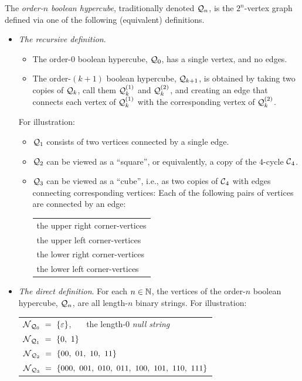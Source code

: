 The {\it order-$n$ boolean hypercube}, traditionally denoted $\mbox{$\cal Q$}_n$, is the $2^n$-vertex graph defined via one of the following (equivalent) definitions.
\begin{itemize}
\item
{\it The recursive definition}. 
  \begin{itemize}
  \item
The order-$0$ boolean hypercube, $\mbox{$\cal Q$}_0$, has a single vertex, and no edges.
  \medskip\item
The order-$(k+1)$ boolean hypercube, $\mbox{$\cal Q$}_{k+1}$, is obtained by taking two copies of $\mbox{$\cal Q$}_k$, call them $\mbox{$\cal Q$}_k^{(1)}$ and $\mbox{$\cal Q$}_k^{(2)}$, and creating an edge that connects each vertex of $\mbox{$\cal Q$}_k^{(1)}$ with the corresponding vertex of $\mbox{$\cal Q$}_k^{(2)}$.
  \end{itemize}
For illustration:
  \begin{itemize}
  \item
$\mbox{$\cal Q$}_1$ consists of two vertices connected by a single edge.
  \medskip\item
$\mbox{$\cal Q$}_2$ can be viewed as a ``square'', or equivalently, a copy of the $4$-cycle $\mbox{$\cal C$}_4$.
  \medskip\item
$\mbox{$\cal Q$}_3$ can be viewed as a ``cube'', i.e., as two copies of $\mbox{$\cal C$}_4$ with edges connecting corresponding vertices: Each of the following pairs of vertices are connected by an edge:

\smallskip

\hspace*{.25in}\begin{tabular}{l}
the upper right corner-vertices \\
the upper left corner-vertices \\
the lower right corner-vertices \\
the lower left corner-vertices
\end{tabular}
  \end{itemize}

\medskip\item
{\it The direct definition}.
For each $n \in \mathbb{N}$, the vertices of the order-$n$ boolean hypercube,
$\mbox{$\cal Q$}_n$, are all length-$n$ binary strings.  For illustration:

\smallskip

\hspace*{.25in}\begin{tabular}{l}
$\n_{{\fq}_0}
  \ = \ 
\{ \varepsilon \}$, \ \ \ the length-$0$ {\em null string} \\ 
$\mbox{$\cal N$}_{{\mbox{{\scriptsize $\cal Q$}}}_1}
  \ = \ \{ 0, \ 1 \}$ \\
$\mbox{$\cal N$}_{{\mbox{{\scriptsize $\cal Q$}}}_2}
  \ = \ \{ 00, \ 01, \ 10, \ 11 \}$ \\
$\mbox{$\cal N$}_{{\mbox{{\scriptsize $\cal Q$}}}_3}
  \ = \ \{ 000, \ 001, \ 010, \ 011, \ 100, \ 101, \ 110, \ 111 \}$
\end{tabular}


\end{itemize}
